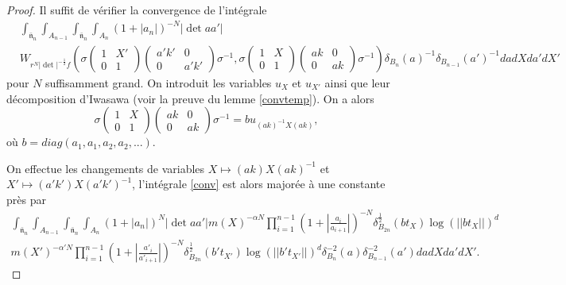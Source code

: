 \documentclass{amsart}
\begin{document}
\begin{proof}
Il suffit de vérifier la convergence de l'intégrale
\begin{equation}
\label{conv}
\begin{split}
&\int_{\bar{\mathfrak{n}}_n} \int_{A_{n-1}} \int_{\bar{\mathfrak{n}}_n} \int_{A_n} (1+|a_n|)^{-N} |\det aa'| \\
& W_{r^N |\det|^{-\frac{1}{2}}f}\left(\sigma \begin{pmatrix}
1 & X' \\
0 & 1
\end{pmatrix} \begin{pmatrix}
a'k' & 0 \\
0 & a'k'
\end{pmatrix} \sigma^{-1}, \sigma \begin{pmatrix}
1 & X \\
0 & 1
\end{pmatrix} \begin{pmatrix}
ak & 0 \\
0 & ak
\end{pmatrix} \sigma^{-1}\right) \delta_{B_n}(a)^{-1} \delta_{B_{n-1}}(a')^{-1}da dX da' dX'
\end{split}
\end{equation}
pour $N$ suffisamment grand. On introduit les variables $u_X$ et $u_{X'}$ ainsi que leur décomposition d'Iwasawa (voir la preuve du lemme \ref{convtemp}). On a alors
\begin{equation}
\sigma \begin{pmatrix}
1 & X \\
0 & 1
\end{pmatrix} \begin{pmatrix}
ak & 0 \\
0 & ak
\end{pmatrix} \sigma^{-1} = bu_{(ak)^{-1}X(ak)},
\end{equation}
où $b = diag(a_1, a_1, a_2, a_2, ...)$.

On effectue les changements de variables $X \mapsto (ak)X(ak)^{-1}$ et $X' \mapsto (a'k')X(a'k')^{-1}$, l'intégrale \ref{conv} est alors majorée à une constante près par
\begin{equation}
\begin{split}
\int_{\bar{\mathfrak{n}}_n} \int_{A_{n-1}} \int_{\bar{\mathfrak{n}}_n} \int_{A_n} (1+|a_n|)^N |\det aa'| m(X)^{-\alpha N} \prod_{i=1}^{n-1} (1 + |\frac{a_i}{a_{i+1}}|)^{-N} \delta^{\frac{1}{2}}_{B_{2n}}(bt_X)\log(||bt_X||)^d \\
m(X')^{-\alpha' N} \prod_{i=1}^{n-1} (1 + |\frac{a'_i}{a'_{i+1}}|)^{-N} \delta^{\frac{1}{2}}_{B_{2n}}(b't_{X'})\log(||b't_{X'}||)^d \delta_{B_n}^{-2}(a) \delta_{B_{n-1}}^{-2}(a') da dX da' dX'.
\end{split}
\end{equation}


\end{proof}
\end{document}
